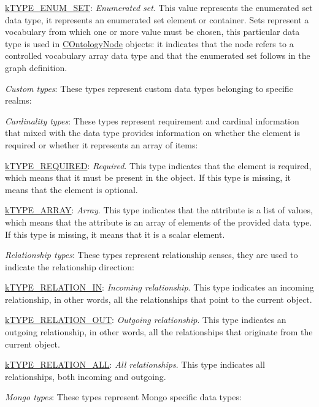 \begin{DoxyItemize}
\begin{DoxyItemize}
\item {\ttfamily \hyperlink{}{k\-T\-Y\-P\-E\-\_\-\-E\-N\-U\-M\-\_\-\-S\-E\-T}}\-: {\itshape Enumerated set}. This value represents the enumerated set data type, it represents an enumerated set element or container. Sets represent a vocabulary from which one or more value must be chosen, this particular data type is used in \hyperlink{class_c_ontology_node}{C\-Ontology\-Node} objects\-: it indicates that the node refers to a controlled vocabulary array data type and that the enumerated set follows in the graph definition. 
\end{DoxyItemize}
\item {\itshape Custom types}\-: These types represent custom data types belonging to specific realms\-: 
\end{DoxyItemize}{\itshape Cardinality types}\-: These types represent requirement and cardinal information that mixed with the data type provides information on whether the element is required or whether it represents an array of items\-: 
\begin{DoxyItemize}
\item {\ttfamily \hyperlink{}{k\-T\-Y\-P\-E\-\_\-\-R\-E\-Q\-U\-I\-R\-E\-D}}\-: {\itshape Required}. This type indicates that the element is required, which means that it must be present in the object. If this type is missing, it means that the element is optional. 
\item {\ttfamily \hyperlink{}{k\-T\-Y\-P\-E\-\_\-\-A\-R\-R\-A\-Y}}\-: {\itshape Array}. This type indicates that the attribute is a list of values, which means that the attribute is an array of elements of the provided data type. If this type is missing, it means that it is a scalar element. 
\end{DoxyItemize}{\itshape Relationship types}\-: These types represent relationship senses, they are used to indicate the relationship direction\-: 
\begin{DoxyItemize}
\item {\ttfamily \hyperlink{}{k\-T\-Y\-P\-E\-\_\-\-R\-E\-L\-A\-T\-I\-O\-N\-\_\-\-I\-N}}\-: {\itshape Incoming relationship}. This type indicates an incoming relationship, in other words, all the relationships that point to the current object. 
\item {\ttfamily \hyperlink{}{k\-T\-Y\-P\-E\-\_\-\-R\-E\-L\-A\-T\-I\-O\-N\-\_\-\-O\-U\-T}}\-: {\itshape Outgoing relationship}. This type indicates an outgoing relationship, in other words, all the relationships that originate from the current object. 
\item {\ttfamily \hyperlink{}{k\-T\-Y\-P\-E\-\_\-\-R\-E\-L\-A\-T\-I\-O\-N\-\_\-\-A\-L\-L}}\-: {\itshape All relationships}. This type indicates all relationships, both incoming and outgoing. 
\end{DoxyItemize}{\itshape Mongo types}\-: These types represent Mongo specific data types\-: 
